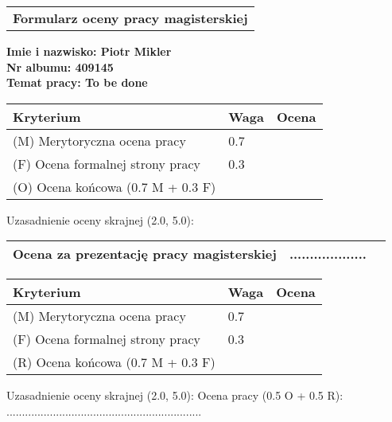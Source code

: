 \pagestyle{empty}
\begin{center}
\begin{tabular}{c}
\bf{\Large{Formularz oceny pracy magisterskiej}}
\end{tabular}
\end{center}
\vskip0.5cm

\rm {\bf{
		\noindent
		Imie i nazwisko: Piotr Mikler\\
		Nr albumu: 409145\\
		Temat pracy: To be done
	}}
\vskip0.5cm

 \vskip0.5cm

\begin{center}
	\begin{tabular}{|p{}|l|l|} \hline
		Kryterium & Waga & Ocena\\
		\hline \hline (M) Merytoryczna ocena pracy & 0.7 & \\
		\hline (F) Ocena formalnej strony pracy & 0.3 & \\
		\hline\hline (O) Ocena końcowa (0.7 M + 0.3 F) &  &\\
		 \hline
	\end{tabular}
\end{center}
Uzasadnienie oceny skrajnej (2.0, 5.0):
\vskip2cm

\begin{center}
	\begin{tabular}{|p{}|l|l|} \hline
	 Ocena za prezentację pracy magisterskiej &   ................... & \\
	 \hline
	\end{tabular}
\end{center}
\vskip0.5cm
\vskip0.5cm

 \vskip0.5cm
\begin{center}
	\begin{tabular}{|p{}|l|l|} \hline
	Kryterium & Waga & Ocena\\
	\hline \hline (M) Merytoryczna ocena pracy & 0.7 & \\
	\hline (F) Ocena formalnej strony pracy & 0.3 & \\
	\hline\hline (R) Ocena końcowa (0.7 M + 0.3 F)&  &\\
	 \hline
	\end{tabular}
\end{center}
Uzasadnienie oceny skrajnej (2.0, 5.0):
\vskip1.75cm
\vskip0.75cm
Ocena pracy (0.5 O + 0.5 R): ...............................................................
\newpage
%


